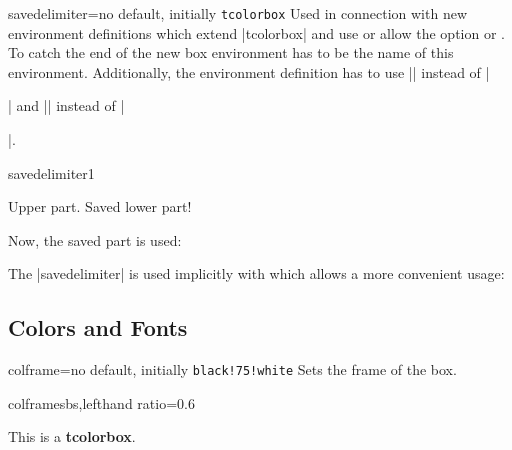 \clearpage
\begin{docTcbKey}{savedelimiter}{=}{no default, initially \texttt{tcolorbox}}
  Used in connection with new environment definitions which extend
  |tcolorbox| and use or allow the option  or .
  To catch the end of the new box environment  has to be the name of
  this environment. Additionally, the environment definition has to use
  |\tcolorbox| instead of
  |\begin{tcolorbox}| and |\endtcolorbox| instead of |\end{tcolorbox}|.
\begin{exdispExample}{savedelimiter1}
\newenvironment{mybox}[1]{%
  \tcolorbox[savedelimiter=mybox,
             savelowerto=\jobname_bspsave3.tex,lowerbox=ignored,
             colback=red!5!white,colframe=red!75!black,fonttitle=\bfseries,
             title={#1}]}%
  {\endtcolorbox}

\begin{mybox}{My Example}
Upper part.
\tcblower
Saved lower part!
\end{mybox}

Now, the saved part is used:
\begin{tcolorbox}[colback=green!5]

\end{tcolorbox}
\end{exdispExample}

\enlargethispage*{1cm}

The |savedelimiter| is used implicitly with  which
allows a more convenient usage:
\end{docTcbKey}



\clearpage
\subsection{Colors and Fonts}
\begin{docTcbKey}{colframe}{=}{no default, initially \texttt{black!75!white}}
  Sets the frame  of the box.
\begin{exdispExample*}{colframe}{sbs,lefthand ratio=0.6}
\begin{tcolorbox}[colframe=red!50!white]
This is a \textbf{tcolorbox}.
\end{tcolorbox}
\end{exdispExample*}
\end{docTcbKey}

